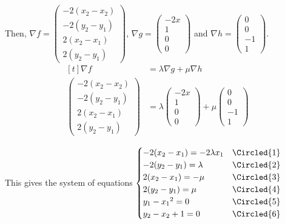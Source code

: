 Then, $\nabla f = \begin{pmatrix} -2(x_2 - x_2) \\ -2(y_2 - y_1) \\ 2(x_2 - x_1) \\ 2(y_2 - y_1) \end{pmatrix}$, $\nabla g = \begin{pmatrix} -2x \\ 1 \\ 0 \\ 0 \end{pmatrix}$ and $\nabla h = \begin{pmatrix} 0 \\ 0 \\ -1 \\ 1 \end{pmatrix}$. 
$$\begin{aligned}[t]
    \nabla f 
     & = \lambda \nabla g + \mu \nabla h \\
    \begin{pmatrix} -2(x_2 - x_2) \\ -2(y_2 - y_1) \\ 2(x_2 - x_1) \\ 2(y_2 - y_1) \end{pmatrix} 
     & = \lambda \begin{pmatrix} -2x \\ 1 \\ 0 \\ 0 \end{pmatrix} + \mu \begin{pmatrix} 0 \\ 0 \\ -1 \\ 1 \end{pmatrix}
\end{aligned}$$

This gives the system of equations $\begin{cases}
    -2(x_2 - x_1) = -2\lambda x_1 & \Circled{1} \\
    -2(y_2 - y_1) = \lambda       & \Circled{2} \\
    2(x_2 - x_1) = -\mu           & \Circled{3} \\
    2(y_2 - y_1) = \mu            & \Circled{4} \\
    y_1 - {x_1}^2 = 0             & \Circled{5} \\
    y_2 - x_2 + 1 = 0             & \Circled{6}
\end{cases}$

